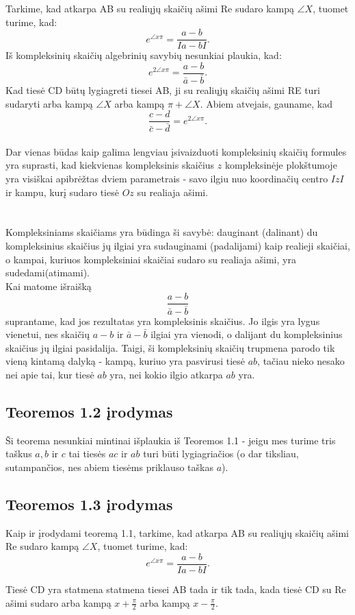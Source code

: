 \documentclass[11pt,a4paper,twoside]{book}
\theoremstyle{definition} \newtheorem*{api}{Apibrėžimas}
\theoremstyle{remark} \newtheorem*{pastaba}{Pastaba}
\begin{document}
Tarkime, kad atkarpa AB su realiųjų skaičių ašimi Re sudaro kampą $\angle X$, tuomet
turime, kad:
$$ e^{\angle x \pi } = \frac {a-b} { Ia-bI }.$$
Iš kompleksinių skaičių algebrinių savybių nesunkiai plaukia, kad:
$$ e^{2 \angle x \pi} = \frac { a-b} { \bar a - \bar b }.$$
Kad tiesė CD būtų lygiagreti tiesei AB, ji su realiųjų skaičių ašimi RE turi sudaryti
arba kampą $\angle X$ arba kampą $ \pi + \angle X$. Abiem atvejais, gauname, kad
$$ \frac{c-d}{\bar c - \bar d } = e^{2 \angle x \pi}.$$
\\
Dar vienas būdas kaip galima lengviau įsivaizduoti kompleksinių skaičių formules
yra suprasti, kad kiekvienas kompleksinis skaičius $z$ kompleksinėje plokštumoje 
yra visiškai apibrėžtas dviem parametrais - savo ilgiu nuo koordinačių centro $IzI$ ir
kampu, kurį sudaro tiesė $Oz$ su realiaja ašimi.
\\
\\
\\
Kompleksiniams skaičiams yra būdinga ši savybė:
dauginant (dalinant) du kompleksinius skaičius jų ilgiai yra sudauginami (padalijami)
kaip realieji skaičiai, o kampai, kuriuos kompleksiniai skaičiai
sudaro su realiaja ašimi, yra sudedami(atimami).
\\
Kai matome išraišką
$$ \frac{a-b}{\bar a - \bar b} $$
suprantame, kad jos rezultatas yra kompleksinis skaičius.
Jo ilgis yra lygus vienetui, nes skaičių $a-b$ ir $\bar a - \bar b$
ilgiai yra vienodi, o dalijant du kompleksinius skaičius jų ilgiai pasidalija.
Taigi, ši kompleksinių skaičių trupmena parodo tik vieną kintamą
dalyką - kampą, kuriuo yra pasvirusi tiesė $ab$, tačiau nieko nesako nei 
apie tai, kur tiesė $ab$ yra, nei kokio ilgio atkarpa $ab$ yra.
\subsection*{Teoremos 1.2 įrodymas}
Ši teorema nesunkiai mintinai išplaukia iš Teoremos 1.1 - jeigu mes turime tris taškus $a, b$ ir $c$ tai tiesės $ac$ ir $ab$ turi būti lygiagriačios (o dar tiksliau, sutampančios, nes abiem tiesėms priklauso taškas $a$).
\subsection*{Teoremos 1.3 įrodymas}

Kaip ir įrodydami teoremą 1.1, tarkime, kad atkarpa AB su realiųjų skaičių ašimi Re sudaro kampą $\angle X$, tuomet turime, kad:
$$ e^{\angle x \pi } = \frac {a-b} { Ia-bI }.$$

Tiesė CD yra statmena statmena tiesei AB tada ir tik
tada, kada tiesė CD su Re ašimi sudaro arba kampą $x+ \frac{\pi}{2}$
arba kampą $x- \frac{\pi}{2}$.
\end{document}
